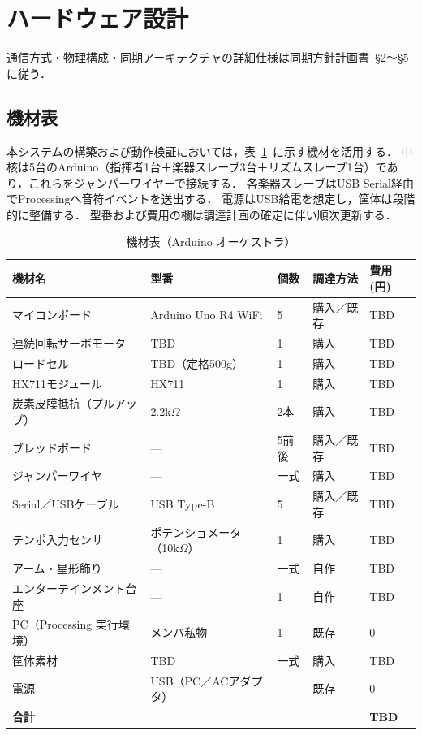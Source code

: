 \documentclass[lualatex,book,paper=a4paper,jafontsize=11.5pt,jafontscale=1.05]{jlreq}
\begin{document}
\section{ハードウェア設計}
通信方式・物理構成・同期アーキテクチャの詳細仕様は同期方針計画書~\S2〜\S5 に従う．

\subsection{機材表}
本システムの構築および動作検証においては，表~\ref{tab:parts}~に示す機材を活用する．
中核は5台のArduino（指揮者1台＋楽器スレーブ3台＋リズムスレーブ1台）であり，これらをジャンパーワイヤーで接続する．
各楽器スレーブはUSB Serial経由でProcessingへ音符イベントを送出する．
電源はUSB給電を想定し，筐体は段階的に整備する．
型番および費用の欄は調達計画の確定に伴い順次更新する．

{\footnotesize
\begin{longtable}{@{}p{6cm} p{4.4cm} p{1.4cm} p{1.6cm} p{1.6cm}@{}}
\caption{機材表（Arduino オーケストラ）}\label{tab:parts}\\
\toprule
\textbf{機材名} & \textbf{型番} & \textbf{個数} & \textbf{調達方法} & \textbf{費用(円)} \\
\midrule \endhead
マイコンボード & Arduino Uno R4 WiFi & 5 & 購入／既存 & TBD \\
連続回転サーボモータ & TBD & 1 & 購入 & TBD \\
ロードセル & TBD（定格500g） & 1 & 購入 & TBD \\
HX711モジュール & HX711 & 1 & 購入 & TBD \\
炭素皮膜抵抗（プルアップ） & 2.2k$\Omega$ & 2本 & 購入 & TBD \\
ブレッドボード & --- & 5前後 & 購入／既存 & TBD \\
ジャンパーワイヤ & --- & 一式 & 購入 & TBD \\
Serial／USBケーブル & USB Type-B & 5 & 購入／既存 & TBD \\
テンポ入力センサ & ポテンショメータ（10k$\Omega$） & 1 & 購入 & TBD \\
アーム・星形飾り & --- & 一式 & 自作 & TBD \\
エンターテインメント台座 & --- & 1 & 自作 & TBD \\
PC（Processing 実行環境） & メンバ私物 & 1 & 既存 & 0 \\
筐体素材 & TBD & 一式 & 購入 & TBD \\
電源 & USB（PC／ACアダプタ） & --- & 既存 & 0 \\
\midrule
\textbf{合計} & & & & \textbf{TBD} \\
\bottomrule
\end{longtable}}
\end{document}

